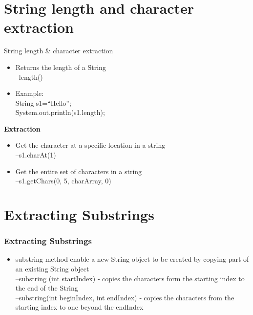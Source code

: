 \documentclass{beamer}
\begin{document}
\section{String length and character extraction}

\begin{frame}{String length \& character extraction}
\begin{itemize}
\item Returns the length of a String\\
–length()\\
\item Example:\\
String s1=“Hello”; \\
System.out.println(s1.length);
\end{itemize}

\textbf{Extraction}
\begin{itemize}
\item Get the character at a specific location in a string\\
–s1.charAt(1)
\item Get the entire set of characters in a string\\
–s1.getChars(0, 5, charArray, 0)
\end{itemize}

\end{frame}


\section{Extracting Substrings}

\begin{frame}[fragile]
\frametitle{Extracting Substrings}
\begin{itemize}
\item substring method enable a new String object to be
created by copying part of an existing String object\\
–substring (int startIndex) ‐ copies the characters form the
starting index to the end of the String\\
–substring(int beginIndex, int endIndex) ‐ copies the
characters from the starting index to one beyond the
endIndex\\
\end{itemize}
\end{frame}
\end{document}
